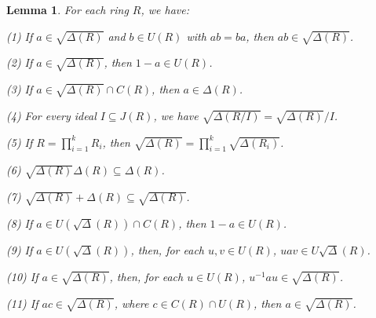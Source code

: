\documentclass[10pt,a4paper]{amsart}
\newtheorem{lemma}{Lemma}
\begin{document}
\begin{lemma}\label{property of J sharp}
For each ring \( R \), we have:

(1) If \( a \in \sqrt{\Delta(R)} \) and \( b \in U(R) \) with \( ab = ba \), then \( ab \in \sqrt{\Delta(R)} \).

(2) If \( a \in \sqrt{\Delta(R)} \), then \( 1 - a \in U(R) \).

(3) If \( a \in \sqrt{\Delta(R)} \cap C(R) \), then \( a \in \Delta(R) \).

(4) For every ideal \( I \subseteq J(R) \), we have \( \sqrt{\Delta(R/I)} = \sqrt{\Delta(R)}/I \).

(5) If \( R = \prod_{i=1}^k R_i \), then \( \sqrt{\Delta(R)} = \prod_{i=1}^k \sqrt{\Delta(R_i)} \).

(6) $\sqrt{\Delta(R)} \Delta(R) \subseteq \Delta(R)$.

(7) $\sqrt{\Delta(R)} + \Delta(R) \subseteq \sqrt{\Delta(R)}$.

(8) If $a\in U(\sqrt{\Delta}(R))\cap C(R)$, then $1-a\in U(R)$.

(9) If $a\in U(\sqrt{\Delta}(R))$, then, for each $u,v\in U(R)$, $uav\in U\sqrt{\Delta}(R)$.

(10) If $a\in \sqrt{\Delta(R)}$, then, for each $u\in U(R)$, $u^{-1}au\in \sqrt{\Delta(R)}$.

(11) If $ac\in\sqrt{\Delta(R)}$, where $c\in C(R)\cap U(R)$, then $a\in \sqrt{\Delta(R)}$.
\end{lemma}
\end{document}
